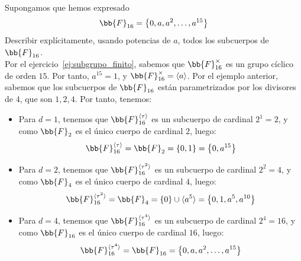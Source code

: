 \begin{ejercicio}
    Supongamos que hemos expresado
    \begin{equation*}
        \bb{F}_{16} = \left\{0, a, a^2, \ldots, a^{15}\right\}
    \end{equation*}
    Describir explícitamente, usando potencias de $a$, todos los subcuerpos de $\bb{F}_{16}$.\\

    Por el ejercicio~\ref{ej:subgrupo_finito}, sabemos que $\bb{F}_{16}^{\times}$ es un grupo cíclico de orden $15$. Por tanto, $a^{15} = 1$, y $\bb{F}_{16}^{\times} = \langle a \rangle$. Por el ejemplo anterior, sabemos que los subcuerpos de $\bb{F}_{16}$ están parametrizados por los divisores de $4$, que son $1,2,4$. Por tanto, tenemos:
    \begin{itemize}
        \item Para $d=1$, tenemos que $\bb{F}_{16}^{\langle \tau \rangle}$ es un subcuerpo de cardinal $2^1=2$, y como $\bb{F}_2$ es el único cuerpo de cardinal $2$, luego:
            \begin{equation*}
                \bb{F}_{16}^{\langle \tau \rangle} = \bb{F}_2 = \left\{0,1\right\} = \left\{0,a^{15}\right\}
            \end{equation*}
        \item Para $d=2$, tenemos que $\bb{F}_{16}^{\langle \tau^2 \rangle}$ es un subcuerpo de cardinal $2^2=4$, y como $\bb{F}_4$ es el único cuerpo de cardinal $4$, luego:
            \begin{equation*}
                \bb{F}_{16}^{\langle \tau^2 \rangle} = \bb{F}_4 = \{0\}\cup \langle a^5 \rangle = \left\{0,1,a^5,a^{10}\right\}
            \end{equation*}
        \item Para $d=4$, tenemos que $\bb{F}_{16}^{\langle \tau^4 \rangle}$ es un subcuerpo de cardinal $2^4=16$, y como $\bb{F}_{16}$ es el único cuerpo de cardinal $16$, luego:
            \begin{equation*}
                \bb{F}_{16}^{\langle \tau^4 \rangle} = \bb{F}_{16} = \left\{0, a, a^2, \ldots, a^{15}\right\}
            \end{equation*}
    \end{itemize}
\end{ejercicio}



